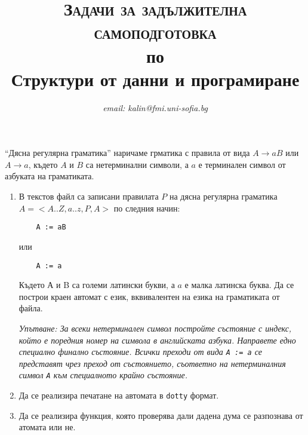 \documentclass[12pt,a4paper]{article}
\author{\textit{email: kalin@fmi.uni-sofia.bg}}
\title{\textsc{Задачи за задължителна самоподготовка} \\
по \\
Структури от данни и програмиране}
\begin{document}
\maketitle


``Дясна регулярна граматика'' наричаме грматика с правила от вида $A \rightarrow aB$ или $A \rightarrow a$, където $A$ и $B$ са нетерминални символи, а $a$ е терминален символ от азбуката на граматиката.



\begin{enumerate}


	\item В текстов файл са записани правилата $P$ на дясна регулярна граматика $A=<A..Z,a..z,P,A>$ по следния начин:
	\begin{verbatim}
	A := aB
	\end{verbatim}

	или

	\begin{verbatim}
	A := a
	\end{verbatim}

	Където А и B са големи латински букви, а $a$ е малка латинска буква. Да се построи краен автомат с език, вквивалентен на езика на граматиката от файла.

	\emph{Упътване: За всеки нетерминален символ постройте състояние с индекс, който е поредния номер на символа в английската азбука. Направете едно специално финално състояние. Всички преходи от вида \texttt{A := a} се представят чрез преход от състоянието, съответно на нетерминалния символ \texttt{A} към специалното крайно състояние.}

	\item Да се реализира печатане на автомата в \texttt{dotty} формат.

	\item Да се реализира функция, която проверява дали дадена дума се разпознава от атомата или не.


\end{enumerate}
\end{document}
